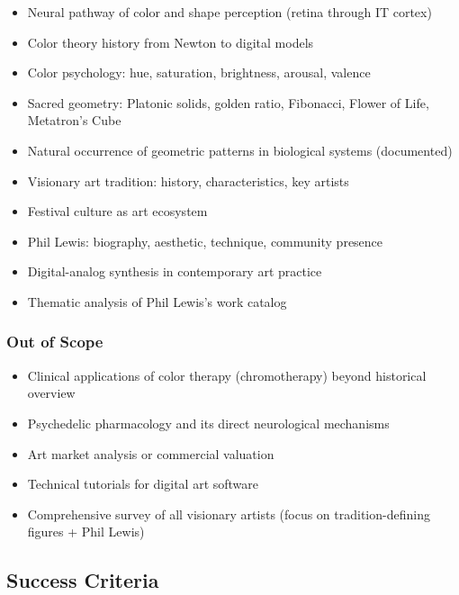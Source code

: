 \documentclass[11pt,letterpaper]{article}
\begin{document}
\begin{itemize}[noitemsep]
  \item Neural pathway of color and shape perception (retina through IT cortex)
  \item Color theory history from Newton to digital models
  \item Color psychology: hue, saturation, brightness, arousal, valence
  \item Sacred geometry: Platonic solids, golden ratio, Fibonacci, Flower of Life, Metatron's Cube
  \item Natural occurrence of geometric patterns in biological systems (documented)
  \item Visionary art tradition: history, characteristics, key artists
  \item Festival culture as art ecosystem
  \item Phil Lewis: biography, aesthetic, technique, community presence
  \item Digital-analog synthesis in contemporary art practice
  \item Thematic analysis of Phil Lewis's work catalog
\end{itemize}

\subsubsection{Out of Scope}

\begin{itemize}[noitemsep]
  \item Clinical applications of color therapy (chromotherapy) beyond historical overview
  \item Psychedelic pharmacology and its direct neurological mechanisms
  \item Art market analysis or commercial valuation
  \item Technical tutorials for digital art software
  \item Comprehensive survey of all visionary artists (focus on tradition-defining figures + Phil Lewis)
\end{itemize}

\subsection{Success Criteria}
\end{document}
